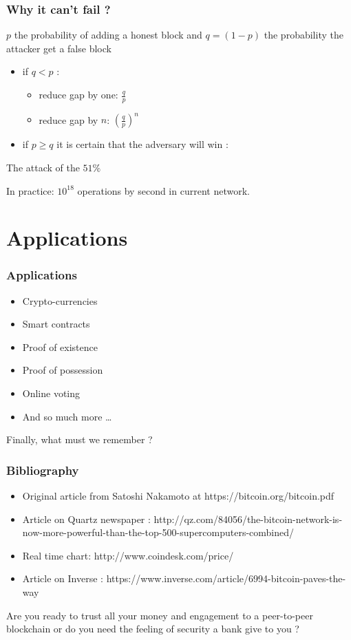 \documentclass[12pt]{beamer}
\begin{document}
\begin{frame}
\frametitle{Why it can't fail ?}
$p$ the probability of adding a honest block and $q = (1-p)$ the probability the attacker get a false block
\begin{itemize}
\item if $q < p$ :
\begin{itemize}
\item reduce gap by one: $\frac{q}{p}$
\item reduce gap by $n$: $\left (\frac{q}{p}\right )^n$
\end{itemize}
\item if $p \ge q$ it is certain that the adversary will win : 
\end{itemize}
\begin{center}
\color{red!50!black} \large The attack of the $51\%$
\end{center}

In practice: $10^{18}$ operations by second in current network.

\end{frame}

\section{Applications}

\begin{frame}
    \frametitle{Applications}
    \begin{itemize}
        \item Crypto-currencies
        \item Smart contracts
        \item Proof of existence
        \item Proof of possession
        \item Online voting
        \item And so much more \ldots
    \end{itemize}
\end{frame}

\begin{frame}
Finally, what must we remember ? %
\end{frame}

\begin{frame}
\frametitle{Bibliography}
\begin{itemize}
\item Original article from Satoshi Nakamoto at https://bitcoin.org/bitcoin.pdf
\item Article on Quartz newspaper : http://qz.com/84056/the-bitcoin-network-is-now-more-powerful-than-the-top-500-supercomputers-combined/
\item Real time chart: http://www.coindesk.com/price/
\item Article on Inverse : https://www.inverse.com/article/6994-bitcoin-paves-the-way
\end{itemize}

\end{frame}

\begin{frame}

Are you ready to trust all your money and engagement to a peer-to-peer blockchain or do you need the feeling of security a bank give to you ?


\end{frame}
\end{document}
